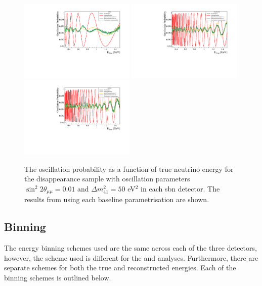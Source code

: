 \begin{figure}[!h]
    \centering
    \includegraphics[width = 0.49\textwidth]{figures-chap5/osc_prob_sbnd.pdf}
    \includegraphics[width = 0.49\textwidth]{figures-chap5/osc_prob_uboone.pdf}
    \includegraphics[width = 0.49\textwidth]{figures-chap5/osc_prob_icarus.pdf}
    \captionsetup{width=0.45\textwidth}
    \parbox[b]{0.49\textwidth}%
    {
    \caption[Oscillation probability for different baseline parametrisations.]{The oscillation probability as a function of true neutrino energy for the \numu disappearance sample with oscillation parameters $\sin^2{2\theta_{\mu\mu}} = 0.01$ and $\Delta m^2_{41} = 50$ eV$^2$ in each \gls{sbn} detector. The results from using each baseline parametrisation are shown. \\}
    \label{fig:baseline_osc_probability}}
\end{figure}

\clearpage
\subsection{Binning}\label{sec:binning}
The energy binning schemes used are the same across each of the three detectors, however, the scheme used is different for the \numu and \nue analyses. Furthermore, there are separate schemes for both the true and reconstructed energies. Each of the binning schemes is outlined below. 

